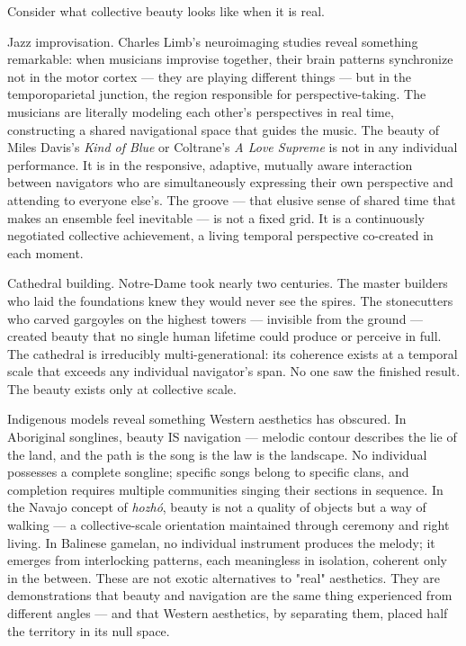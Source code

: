 Consider what collective beauty looks like when it is real.


Jazz improvisation. Charles Limb's neuroimaging studies reveal something remarkable: when musicians improvise together, their brain patterns synchronize not in the motor cortex — they are playing different things — but in the temporoparietal junction, the region responsible for perspective-taking. The musicians are literally modeling each other's perspectives in real time, constructing a shared navigational space that guides the music. The beauty of Miles Davis's \textit{Kind of Blue} or Coltrane's \textit{A Love Supreme} is not in any individual performance. It is in the responsive, adaptive, mutually aware interaction between navigators who are simultaneously expressing their own perspective and attending to everyone else's. The groove — that elusive sense of shared time that makes an ensemble feel inevitable — is not a fixed grid. It is a continuously negotiated collective achievement, a living temporal perspective co-created in each moment.


Cathedral building. Notre-Dame took nearly two centuries. The master builders who laid the foundations knew they would never see the spires. The stonecutters who carved gargoyles on the highest towers — invisible from the ground — created beauty that no single human lifetime could produce or perceive in full. The cathedral is irreducibly multi-generational: its coherence exists at a temporal scale that exceeds any individual navigator's span. No one saw the finished result. The beauty exists only at collective scale.


Indigenous models reveal something Western aesthetics has obscured. In Aboriginal songlines, beauty IS navigation — melodic contour describes the lie of the land, and the path is the song is the law is the landscape. No individual possesses a complete songline; specific songs belong to specific clans, and completion requires multiple communities singing their sections in sequence. In the Navajo concept of \textit{hozhó}, beauty is not a quality of objects but a way of walking — a collective-scale orientation maintained through ceremony and right living. In Balinese gamelan, no individual instrument produces the melody; it emerges from interlocking patterns, each meaningless in isolation, coherent only in the between. These are not exotic alternatives to "real" aesthetics. They are demonstrations that beauty and navigation are the same thing experienced from different angles — and that Western aesthetics, by separating them, placed half the territory in its null space.


